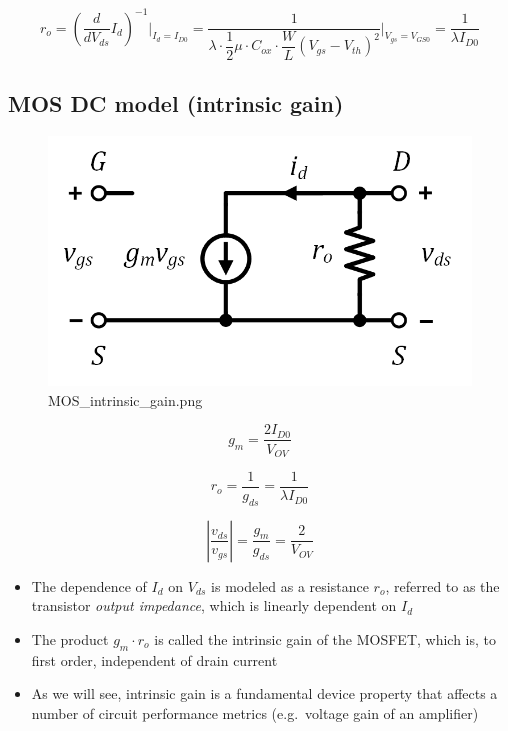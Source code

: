\documentclass[11pt]{article}
\providecommand{\tightlist}{%
      \setlength{\itemsep}{0pt}\setlength{\parskip}{0pt}}
\begin{document}
\begin{equation}
r_o = \left(\dfrac{d}{dV_{ds}}I_d \right)^{-1}\bigg\rvert_{I_d = I_{D0}} =  \dfrac{1}{\lambda \cdot \dfrac{1}{2}\mu\cdot C_{ox} \cdot \dfrac{W}{L}(V_{gs}-V_{th})^2}\bigg\rvert_{V_{gs} = V_{GS0}} = \dfrac{1}{\lambda I_{D0}}
\end{equation}

    \hypertarget{mos-dc-model-intrinsic-gain}{%
\subsection{MOS DC model (intrinsic
gain)}\label{mos-dc-model-intrinsic-gain}}

    \begin{figure}
\centering
\includegraphics{MOS_intrinsic_gain.png}
\caption{MOS\_intrinsic\_gain.png}
\end{figure}

    \begin{equation}
g_m = \dfrac{2I_{D0}}{V_{OV}}
\end{equation}

\begin{equation}
r_o = \dfrac{1}{g_{ds}} = \dfrac{1}{\lambda I_{D0}}
\end{equation}

\begin{equation}
\left|\dfrac{v_{ds}}{v_{gs}}\right| = \dfrac{g_m}{g_{ds}} = \dfrac{2}{V_{OV}}
\end{equation}

    \begin{itemize}
\tightlist
\item
  The dependence of \(I_d\) on \(V_{ds}\) is modeled as a resistance
  \(r_o\), referred to as the transistor \emph{output impedance}, which
  is linearly dependent on \(I_d\)
\item
  The product \(g_m \cdot r_o\) is called the intrinsic gain of the
  MOSFET, which is, to first order, independent of drain current
\item
  As we will see, intrinsic gain is a fundamental device property that
  affects a number of circuit performance metrics (e.g.~voltage gain of
  an amplifier)
\end{itemize}
\end{document}
